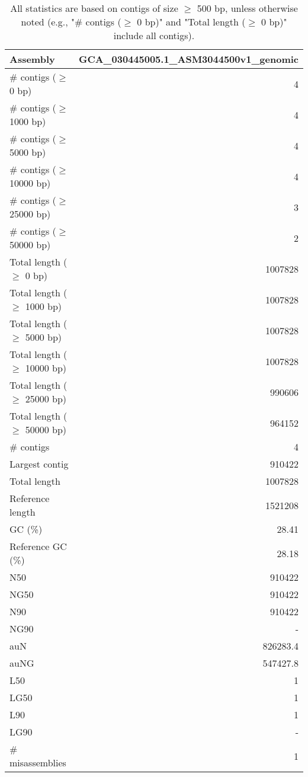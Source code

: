 \documentclass[12pt,a4paper]{article}
\begin{document}
\begin{table}[ht]
\begin{center}
\caption{All statistics are based on contigs of size $\geq$ 500 bp, unless otherwise noted (e.g., "\# contigs ($\geq$ 0 bp)" and "Total length ($\geq$ 0 bp)" include all contigs).}
\begin{tabular}{|l*{1}{|r}|}
\hline
Assembly & GCA\_030445005.1\_ASM3044500v1\_genomic \\ \hline
\# contigs ($\geq$ 0 bp) & 4 \\ \hline
\# contigs ($\geq$ 1000 bp) & 4 \\ \hline
\# contigs ($\geq$ 5000 bp) & 4 \\ \hline
\# contigs ($\geq$ 10000 bp) & 4 \\ \hline
\# contigs ($\geq$ 25000 bp) & 3 \\ \hline
\# contigs ($\geq$ 50000 bp) & 2 \\ \hline
Total length ($\geq$ 0 bp) & 1007828 \\ \hline
Total length ($\geq$ 1000 bp) & 1007828 \\ \hline
Total length ($\geq$ 5000 bp) & 1007828 \\ \hline
Total length ($\geq$ 10000 bp) & 1007828 \\ \hline
Total length ($\geq$ 25000 bp) & 990606 \\ \hline
Total length ($\geq$ 50000 bp) & 964152 \\ \hline
\# contigs & 4 \\ \hline
Largest contig & 910422 \\ \hline
Total length & 1007828 \\ \hline
Reference length & 1521208 \\ \hline
GC (\%) & 28.41 \\ \hline
Reference GC (\%) & 28.18 \\ \hline
N50 & 910422 \\ \hline
NG50 & 910422 \\ \hline
N90 & 910422 \\ \hline
NG90 & - \\ \hline
auN & 826283.4 \\ \hline
auNG & 547427.8 \\ \hline
L50 & 1 \\ \hline
LG50 & 1 \\ \hline
L90 & 1 \\ \hline
LG90 & - \\ \hline
\# misassemblies & 1 \\ \hline

\end{tabular}
\end{center}
\end{table}
\end{document}
